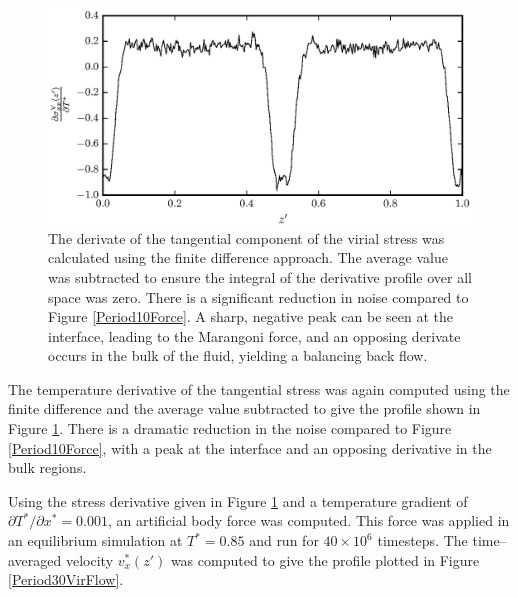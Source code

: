 \begin{figure}[h!]
\centering
\includegraphics[scale=1.0]{Period30VirForce}
\caption{The derivate of the tangential component of the virial stress was calculated using the finite difference approach.
The average value was subtracted to ensure the integral of the derivative profile over all space was zero.
There is a significant reduction in noise compared to Figure \ref{Period10Force}.
A sharp, negative peak can be seen at the interface, leading to the Marangoni force, and an opposing derivate occurs in the bulk of the fluid, yielding a balancing back flow.
}
\label{Period30VirForce}
\end{figure}

The temperature derivative of the tangential stress was again computed using the finite difference and the average value subtracted to give the profile shown in Figure \ref{Period30VirForce}.
There is a dramatic reduction in the noise compared to Figure \ref{Period10Force}, with a peak at the interface and an opposing derivative in the bulk regions.
\FloatBarrier

Using the stress derivative given in Figure \ref{Period30VirForce} and a temperature gradient of $\partial T^{*} / \partial x^{*} = 0.001$, an artificial body force was computed.
This force was applied in an equilibrium simulation at $T^{*} = 0.85$ and run for $40 \times 10^{6}$ timesteps.
The time--averaged velocity $v^{*}_x(z')$ was computed to give the profile plotted in Figure \ref{Period30VirFlow}.

